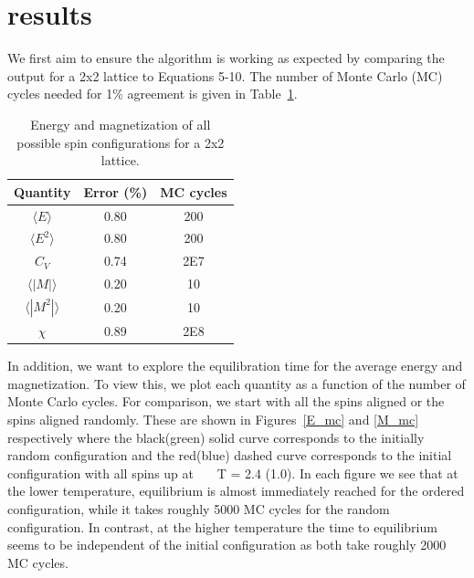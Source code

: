 \documentclass[prc,amsmath,twocolumn,superscriptaddress]{revtex4}
\begin{document}
\section{results}
\label{results}
We first aim to ensure the algorithm is working as expected by comparing the output for a 2x2 lattice to Equations 5-10. The number of Monte Carlo (MC) cycles needed for 1\% agreement is given in Table~\ref{cycles}.

\begin{table}[b]
\centering
\begin{tabular}{|c|c|c|}
\hline
Quantity& Error (\%) & MC cycles\\
\hline
$\langle E\rangle$&0.80 &200 \\
$\langle E^2\rangle$&0.80 &200 \\
$C_V$ &0.74&2E7\\
$\langle |M|\rangle$&0.20 &10 \\
$\langle |M^2|\rangle$& 0.20 &10 \\
$\chi$&0.89&2E8\\
\hline
\end{tabular}
\caption{Energy and magnetization of all possible spin configurations for a 2x2 lattice.}
\label{cycles}
\end{table}

In addition, we want to explore the equilibration time for the average energy and magnetization. To view this, we plot each quantity as a function of the number of Monte Carlo cycles. For comparison, we start with all the spins aligned or the spins aligned randomly. These are shown in Figures~\ref{E_mc} and \ref{M_mc} respectively where the black(green) solid curve corresponds to the initially random configuration and the red(blue) dashed curve corresponds to the initial configuration with all spins up  at ~~~T = 2.4 (1.0). In each figure we see that at the lower temperature, equilibrium is almost immediately reached for the ordered configuration, while it takes roughly 5000 MC cycles for the random configuration. In contrast, at the higher temperature the time to equilibrium seems to be independent of the initial configuration as both take roughly 2000 MC cycles.
\end{document}
